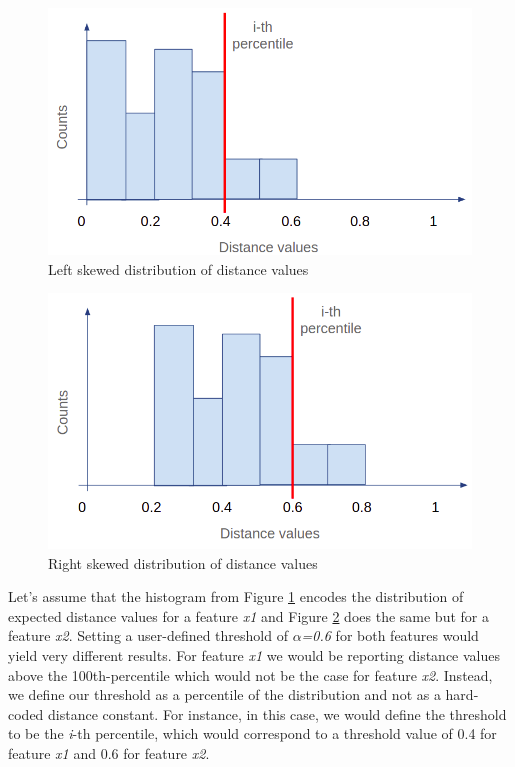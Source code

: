 \begin{figure}[!htb]
    \begin{center}
      \includegraphics[scale=0.4]{figures/skewed-left-distro.png}
      \caption[]{Left skewed distribution of distance values}
      \label{fig:skewed-left-distro}
    \end{center}
\end{figure}

\begin{figure}[!htb]
    \begin{center}
      \includegraphics[scale=0.4]{figures/skewed-right-distro.png}
      \caption[]{Right skewed distribution of distance values}
      \label{fig:skewed-right-distro}
    \end{center}
\end{figure}

Let's assume that the histogram from Figure \ref{fig:skewed-left-distro} encodes the distribution of expected distance values for a feature \textit{x1} and Figure \ref{fig:skewed-right-distro} does the same but for a feature \textit{x2}. Setting a user-defined threshold of \textit{$\alpha$=0.6} for both features would yield very different results. For feature \textit{x1} we would be reporting distance values above the 100th-percentile which would not be the case for feature \textit{x2}. Instead, we define our threshold as a percentile of the distribution and not as a hard-coded distance constant. For instance, in this case, we would define the threshold to be the \textit{i}-th percentile, which would correspond to a threshold value of 0.4 for feature \textit{x1} and 0.6 for feature \textit{x2}.

